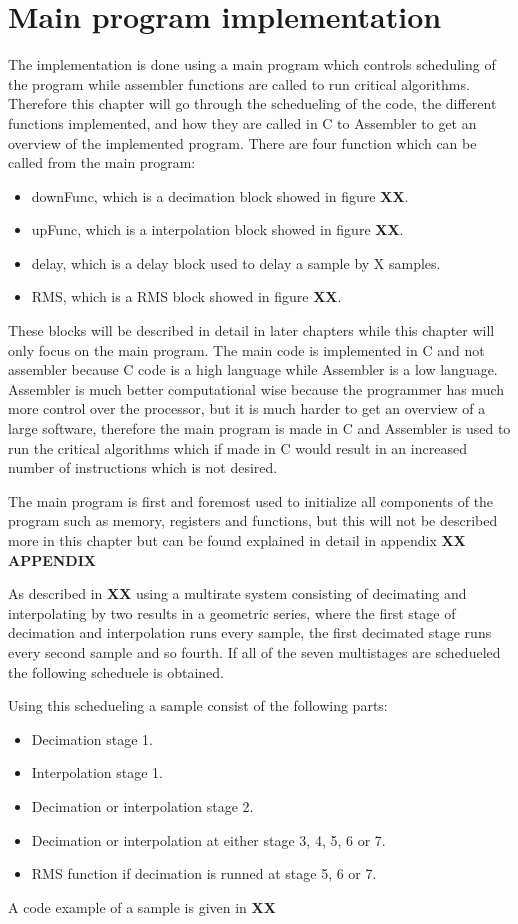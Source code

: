 \chapter{Main program implementation}
The implementation is done using a main program which controls scheduling of the program while assembler functions are called to run critical algorithms. Therefore this chapter will go through the schedueling of the code, the different functions implemented, and how they are called in C to Assembler to get an overview of the implemented program. There are four function which can be called from the main program:
\begin{itemize}
\item downFunc, which is a decimation block showed in figure \textbf{XX}.
\item upFunc, which is a interpolation block showed in figure \textbf{XX}.
\item delay, which is a delay block used to delay a sample by X samples.
\item RMS, which is a RMS block showed in figure \textbf{XX}. 
\end{itemize}
These blocks will be described in detail in later chapters while this chapter will only focus on the main program. The main code is implemented in C and not assembler because C code is a high language while Assembler is a low language. Assembler is much better computational wise because the programmer has much more control over the processor, but it is much harder to get an overview of a large software, therefore the main program is made in C and Assembler is used to run the critical algorithms which if made in C would result in an increased number of instructions which is not desired. 

The main program is first and foremost used to initialize all components of the program such as memory, registers and functions, but this will not be described more in this chapter but can be found explained in detail in appendix \textbf{XX APPENDIX}

As described in \textbf{XX} using a multirate system consisting of decimating and interpolating by two results in a geometric series, where the first stage of decimation and interpolation runs every sample, the first decimated stage runs every second sample and so fourth. If all of the seven multistages are schedueled the following scheduele is obtained.    


Using this schedueling a sample consist of the following parts:
\begin{itemize}
\item Decimation stage 1.
\item Interpolation stage 1.
\item Decimation or interpolation stage 2.
\item Decimation or interpolation at either stage 3, 4, 5, 6 or 7. 
\item RMS function if decimation is runned at stage 5, 6 or 7.
\end{itemize}

A code example of a sample is given in \textbf{XX} 

 
